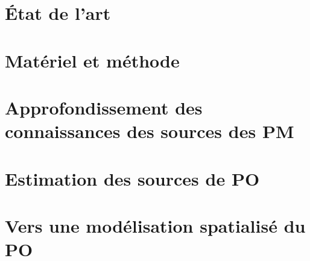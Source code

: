 \documentclass[a4paper,12pt]{book}
\begin{document}
\chapter{État de l'art}
\label{cha:etat_de_lart}
\PartialToc
\clearpage

\clearpage
\printbibliography[segment=\therefsegment,heading=subbibliography]

\chapter{Matériel et méthode}
\label{cha:materiel_et_methode}
\PartialToc
\clearpage

\clearpage
\printbibliography[segment=\therefsegment,heading=subbibliography]

\chapter{Approfondissement des connaissances des sources des PM}%
\label{cha:approfondissement_des_connaissances_des_sources_des_pm}
\PartialToc
\clearpage

\clearpage
\printbibliography[segment=\therefsegment,heading=subbibliography]

\chapter{Estimation des sources de PO}
\label{cha:estimation_des_sources_de_PO}
\PartialToc
\clearpage

\clearpage
\printbibliography[segment=\therefsegment,heading=subbibliography]

% 

\chapter{Vers une modélisation spatialisé du PO}
\label{cha:spatio_temporal_modelizing}
% 
\end{document}
